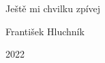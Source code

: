 \vspace*{5cm}
\begin{center}
\begin{Huge}
	\selectfont
	Ještě mi chvilku zpívej
\end{Huge}
\vspace{1cm}

\begin{Large}
František Hluchník
\vspace{4mm}

2022
\end{Large}
\end{center}
\newpage
